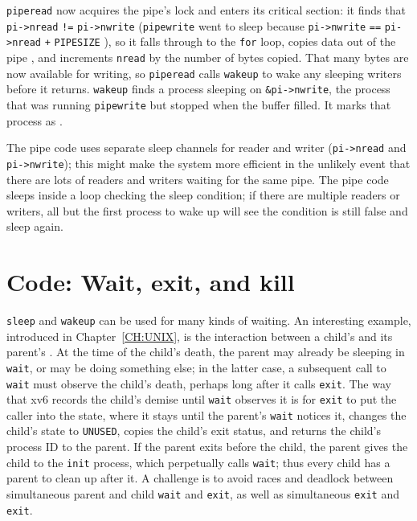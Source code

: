 \lstinline{piperead}
now acquires the pipe's lock and enters its critical section:
it finds that
\lstinline{pi->nread}
\lstinline{!=}
\lstinline{pi->nwrite}
(\lstinline{pipewrite}
went to sleep because
\lstinline{pi->nwrite}
\lstinline{==}
\lstinline{pi->nread}
\lstinline{+}
\lstinline{PIPESIZE}
),
so it falls through to the 
\lstinline{for}
loop, copies data out of the pipe
,
and increments 
\lstinline{nread}
by the number of bytes copied.
That many bytes are now available for writing, so
\lstinline{piperead}
calls
\lstinline{wakeup}
to wake any sleeping writers
before it returns.
\lstinline{wakeup}
finds a process sleeping on
\lstinline{&pi->nwrite},
the process that was running
\lstinline{pipewrite}
but stopped when the buffer filled.
It marks that process as
.

The pipe code uses separate sleep channels for reader and writer
(\lstinline{pi->nread}
and
\lstinline{pi->nwrite});
this might make the system more efficient in the unlikely
event that there are lots of
readers and writers waiting for the same pipe.
The pipe code sleeps inside a loop checking the
sleep condition; if there are multiple readers
or writers, all but the first process to wake up
will see the condition is still false and sleep again.
\section{Code: Wait, exit, and kill}
\lstinline{sleep}
and
\lstinline{wakeup}
can be used for many kinds of waiting.
An interesting example, introduced in Chapter~\ref{CH:UNIX},
is the interaction between a child's 
and its parent's .
At the time of the child's death, the parent may already
be sleeping in {\tt wait}, or may be doing something else;
in the latter case, a subsequent call to {\tt wait} must
observe the child's death, perhaps long after it calls {\tt exit}.
The way that xv6 records the child's demise until {\tt wait}
observes it is for {\tt exit} to put the caller into the 
state, where it stays until the parent's {\tt wait} notices it, changes
the child's state to {\tt UNUSED}, copies the child's exit status,
and returns the child's process ID to the parent.
If the parent exits before the child, the 
parent gives the child to the
\lstinline{init}
process, which perpetually calls {\tt wait};
thus
every child has a parent to clean up after it.
A challenge is
to avoid races and deadlock between
simultaneous parent and child
\lstinline{wait}
and
\lstinline{exit},
as well as simultaneous
\lstinline{exit} and \lstinline{exit}.

